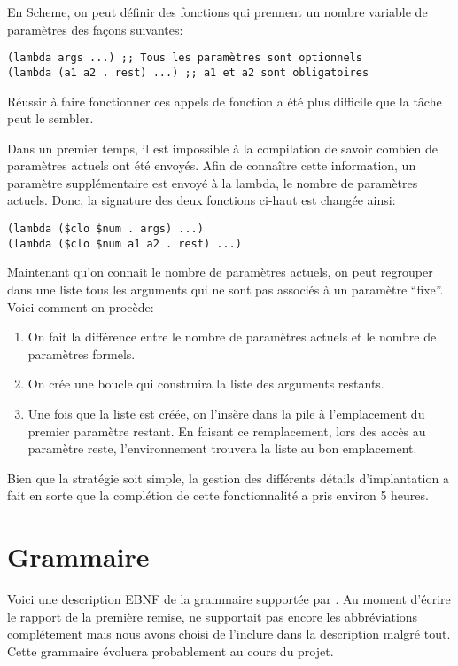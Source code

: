 \documentclass[11pt]{report}
\begin{document}
En Scheme, on peut définir des fonctions qui prennent un nombre
variable de paramètres des façons suivantes:

\begin{verbatim}
(lambda args ...) ;; Tous les paramètres sont optionnels
(lambda (a1 a2 . rest) ...) ;; a1 et a2 sont obligatoires
\end{verbatim}

Réussir à faire fonctionner ces appels de fonction a été plus
difficile que la tâche peut le sembler.

Dans un premier temps, il est impossible à la compilation de savoir
combien de paramètres actuels ont été envoyés.  Afin de connaître
cette information, un paramètre supplémentaire est envoyé à la lambda,
le nombre de paramètres actuels.  Donc, la signature des deux
fonctions ci-haut est changée ainsi:

\begin{verbatim}
(lambda ($clo $num . args) ...)
(lambda ($clo $num a1 a2 . rest) ...)
\end{verbatim}

Maintenant qu'on connait le nombre de paramètres actuels, on peut
regrouper dans une liste tous les arguments qui ne sont pas associés
à un paramètre ``fixe''.  Voici comment on procède:

\begin{enumerate}
\item On fait la différence entre le nombre de paramètres actuels et
  le nombre de paramètres formels.
\item On crée une boucle qui construira la liste des arguments restants.
\item Une fois que la liste est créée, on l'insère dans la pile à
  l'emplacement du premier paramètre restant.  En faisant ce
  remplacement, lors des accès au paramètre reste, l'environnement
  trouvera la liste au bon emplacement.
\end{enumerate}

Bien que la stratégie soit simple, la gestion des différents détails
d'implantation a fait en sorte que la complétion de cette
fonctionnalité a pris environ 5 heures.




\appendix
\chapter{Grammaire}
\label{grammaire}
Voici une description EBNF de la grammaire supportée par \sins{}. Au
moment d'écrire le rapport de la première remise, \sins{} ne
supportait pas encore les abbréviations complétement mais nous avons
choisi de l'inclure dans la description malgré tout. Cette grammaire
évoluera probablement au cours du projet.
\end{document}
